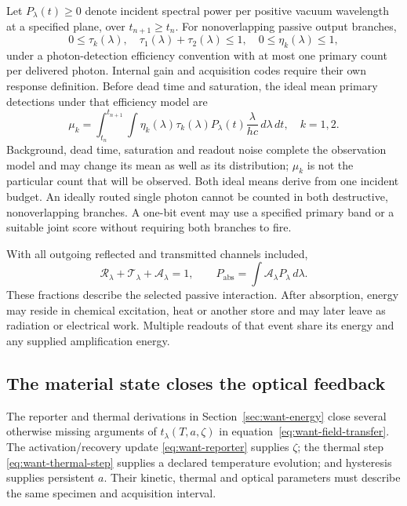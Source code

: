 Let $P_\lambda(t)\ge0$ denote incident spectral power per positive vacuum
wavelength at a specified plane, over $t_{n+1}\ge t_n$. For nonoverlapping
passive output branches,
\begin{equation}
 0\le\tau_k(\lambda),\quad
 \tau_1(\lambda)+\tau_2(\lambda)\le1,\quad
 0\le\eta_k(\lambda)\le1,
 \label{eq:want-spectral-budget}
\end{equation}
under a photon-detection efficiency convention with at most one primary count
per delivered photon. Internal gain and acquisition codes require their own
response definition. Before dead time and saturation, the ideal mean primary
detections under that efficiency model are
\begin{equation}
 \mu_k=\int_{t_n}^{t_{n+1}}\!\int
 \eta_k(\lambda)\tau_k(\lambda)P_\lambda(t)
 \frac{\lambda}{hc}\,d\lambda\,dt,
 \quad k=1,2.
 \label{eq:want-photon-mean}
\end{equation}
Background, dead time, saturation and readout noise complete the observation
model and may change its mean as well as its distribution; $\mu_k$ is not the
particular count that will be observed. Both ideal means derive
from one incident budget. An ideally routed single photon cannot be counted
in both destructive, nonoverlapping branches. A one-bit event may use a
specified primary band or a suitable joint score without requiring both
branches to fire.

With all outgoing reflected and transmitted channels included,
\begin{equation}
 \mathcal R_\lambda+\mathcal T_\lambda+\mathcal A_\lambda=1,
 \qquad P_{\mathrm{abs}}=\int\mathcal A_\lambda P_\lambda\,d\lambda.
 \label{eq:want-absorption}
\end{equation}
These fractions describe the selected passive interaction. After absorption,
energy may reside in chemical excitation, heat or another store and may later
leave as radiation or electrical work. Multiple readouts of that event share
its energy and any supplied amplification energy.

\subsection{The material state closes the optical feedback}

The reporter and thermal derivations in Section~\ref{sec:want-energy} close
several otherwise missing arguments of $t_\lambda(T,a,\zeta)$ in
equation~\eqref{eq:want-field-transfer}. The activation/recovery update
\eqref{eq:want-reporter} supplies $\zeta$; the thermal step
\eqref{eq:want-thermal-step} supplies a declared temperature evolution; and
hysteresis supplies persistent $a$. Their kinetic, thermal and optical
parameters must describe the same specimen and acquisition interval.

